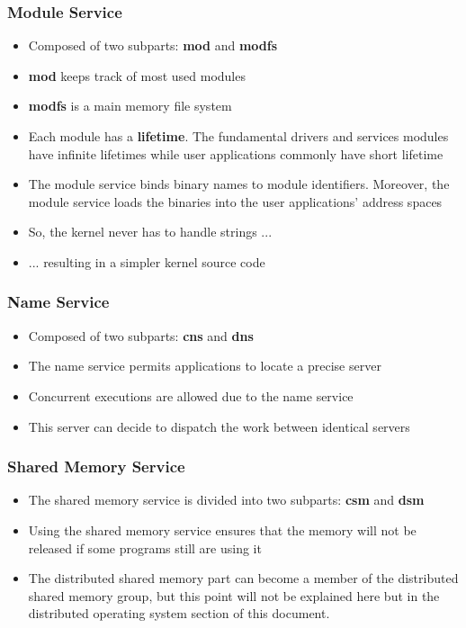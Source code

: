\documentclass[8pt]{beamer}
\begin{document}
\begin{frame}
  \frametitle{Module Service}

  \begin{itemize}[<+->]
    \item
      Composed of two subparts: \textbf{mod} and \textbf{modfs}
    \item
      \textbf{mod} keeps track of most used modules
    \item
      \textbf{modfs} is a main memory file system
    \item
      Each module has a \textbf{lifetime}. The fundamental drivers
      and services modules have infinite lifetimes while user applications
      commonly have short lifetime
    \item
      The module service binds binary names to module identifiers.
      Moreover, the module service loads the binaries into the
      user applications' address spaces
    \item
      So, the kernel never has to handle strings ...
    \item
      ... resulting in a simpler kernel source code
  \end{itemize}
\end{frame}


\begin{frame}
  \frametitle{Name Service}

  \begin{itemize}
    \item
      Composed of two subparts: \textbf{cns} and \textbf{dns}
    \item
      The name service permits applications to locate a precise server
    \item
      Concurrent executions are allowed due to the name service
    \item
      This server can decide to dispatch the work between identical servers
  \end{itemize}
\end{frame}


\begin{frame}
  \frametitle{Shared Memory Service}

  \begin{itemize}[<+->]
    \item
      The shared memory service is divided into two subparts:
      \textbf{csm} and \textbf{dsm}
    \item
      Using the shared memory service ensures that the memory will not
      be released if some programs still are using it
    \item
      The distributed shared memory part can become a member of the
      distributed shared memory group, but this point will not be
      explained here but in the distributed operating system section of
      this document.
  \end{itemize}
\end{frame}
\end{document}
